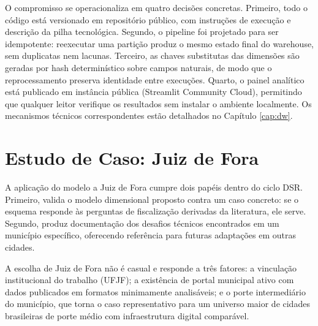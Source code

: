 O compromisso se operacionaliza em quatro decisões concretas. Primeiro, todo o código está versionado em repositório público, com instruções de execução e descrição da pilha tecnológica. Segundo, o pipeline foi projetado para ser idempotente: reexecutar uma partição produz o mesmo estado final do warehouse, sem duplicatas nem lacunas. Terceiro, as chaves substitutas das dimensões são geradas por hash determinístico sobre campos naturais, de modo que o reprocessamento preserva identidade entre execuções. Quarto, o painel analítico está publicado em instância pública (Streamlit Community Cloud), permitindo que qualquer leitor verifique os resultados sem instalar o ambiente localmente.
Os mecanismos técnicos correspondentes estão detalhados no Capítulo \ref{cap:dw}.

\section{Estudo de Caso: Juiz de Fora}
\label{sec:estudo_caso}

A aplicação do modelo a Juiz de Fora cumpre dois papéis dentro do ciclo
DSR. Primeiro, valida o modelo dimensional proposto contra um caso
concreto: se o esquema responde às perguntas de fiscalização derivadas
da literatura, ele serve. Segundo, produz documentação dos desafios
técnicos encontrados em um município específico, oferecendo referência
para futuras adaptações em outras cidades.

A escolha de Juiz de Fora não é casual e responde a três fatores: a
vinculação institucional do trabalho (UFJF); a existência de portal
municipal ativo com dados publicados em formatos minimamente
analisáveis; e o porte intermediário do município, que torna o caso
representativo para um universo maior de cidades brasileiras de porte
médio com infraestrutura digital comparável.
